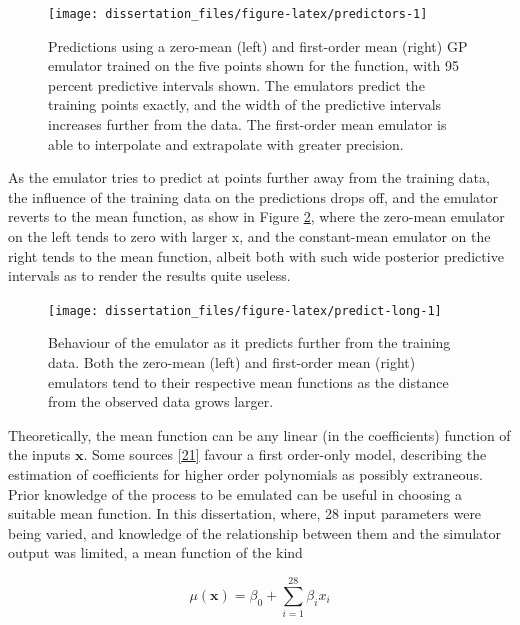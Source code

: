 \documentclass[
  12pt,
  a4paper,
  twoside]{book}
\begin{document}
\begin{figure}[H]

{\centering \texttt{[image: dissertation\_files/figure-latex/predictors-1]} 

}

\caption{Predictions using a zero-mean (left) and first-order mean (right) GP emulator trained on the five points shown for the function, with 95 percent predictive intervals shown. The emulators predict the training points exactly, and the width of the predictive intervals increases further from the data. The first-order mean emulator is able to interpolate and extrapolate with greater precision.}\label{fig:predictors}
\end{figure}

As the emulator tries to predict at points further away from the training data, the influence of the training data on the predictions drops off, and the emulator reverts to the mean function, as show in Figure \ref{fig:predict-long}, where the zero-mean emulator on the left tends to zero with larger x, and the constant-mean emulator on the right tends to the mean function, albeit both with such wide posterior predictive intervals as to render the results quite useless.

\begin{figure}[H]

{\centering \texttt{[image: dissertation\_files/figure-latex/predict-long-1]} 

}

\caption{Behaviour of the emulator as it predicts further from the training data. Both the zero-mean (left) and first-order mean (right) emulators tend to their respective mean functions as the distance from the observed data grows larger.}\label{fig:predict-long}
\end{figure}

Theoretically, the mean function can be any linear (in the coefficients) function of the inputs \(\mathbf{x}\). Some sources \protect\hyperlink{ref-gp_comparison}{{[}21{]}} favour a first order-only model, describing the estimation of coefficients for higher order polynomials as possibly extraneous. Prior knowledge of the process to be emulated can be useful in choosing a suitable mean function. In this dissertation, where, 28 input parameters were being varied, and knowledge of the relationship between them and the simulator output was limited, a mean function of the kind

\begin{equation}
\label{eq:simple-mean-function}
\mu(\mathbf{x}) = \beta_0 + \sum_{i=1}^{28} \beta_i x_i
\end{equation}
\end{document}
